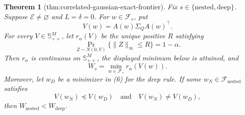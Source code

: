 \documentclass{article}
\newtheorem{theorem}{Theorem}
\begin{document}
\begin{theorem}[thm:correlated-gaussian-exact-frontier]\label{thm:correlated-gaussian-exact-frontier}
Fix \(s\in\{\mathrm{nested},\mathrm{deep}\}\).  Suppose \(\mathcal E\ne\varnothing\) and \(L=\delta=0\).  For \(w\in\mathcal F_s\), put
\[
 V(w)=A(w)\Sigma_QA(w)^{\top}.
\]
For every \(V\in\mathbb S_{++}^M\), let \(r_\alpha(V)\) be the unique positive \(R\) satisfying
\[
 \Pr_{Z\sim N(0,V)}\{\lVert Z\rVert_\infty\leq R\}=1-\alpha.
\]
Then \(r_\alpha\) is continuous on \(\mathbb S_{++}^M\), the displayed minimum below is attained, and
\[
 W_s=\min_{w\in\mathcal F_s}r_\alpha\!\left(V(w)\right). \tag{6}
\]
Moreover, let \(w_D\) be a minimizer in (6) for the deep rule.  If some \(w_N\in\mathcal F_{\mathrm{nested}}\) satisfies
\[
 V(w_N)\preceq V(w_D)
 \quad\text{and}\quad V(w_N)\ne V(w_D), \tag{7}
\]
then \(W_{\mathrm{nested}}<W_{\mathrm{deep}}\).
\end{theorem}
\end{document}
